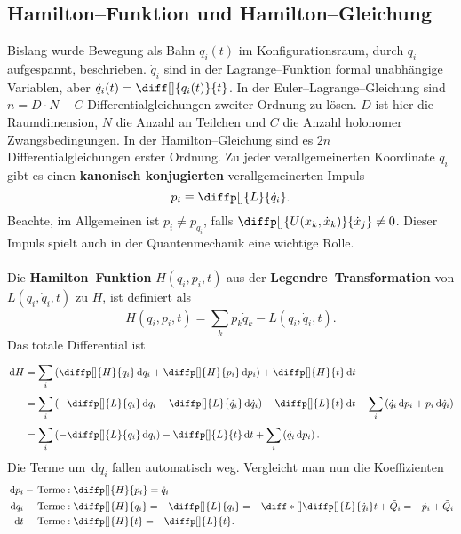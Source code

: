 \documentclass[a4paper,12pt]{article}
\newcommand{\td}{\,\text{d}}
\numberwithin{equation}{section}
\begin{document}
\subsection{Hamilton--Funktion und Hamilton--Gleichung}
Bislang wurde Bewegung als Bahn $q_i(t)$ im Konfigurationsraum, durch $q_i$ aufgespannt, beschrieben. $\dot{q}_i$ sind in der Lagrange--Funktion formal unabhängige Variablen, aber $\dot{q}_i(t)=\diff[]{q_i(t)}{t}$. In der Euler--Lagrange--Gleichung sind $n=D\cdot N-C$ Differentialgleichungen zweiter Ordnung zu lösen. $D$ ist hier die Raumdimension, $N$ die Anzahl an Teilchen und $C$ die Anzahl holonomer Zwangsbedingungen. In der Hamilton--Gleichung sind es $2n$ Differentialgleichungen erster Ordnung. Zu jeder verallgemeinerten Koordinate $q_i$ gibt es einen \textbf{kanonisch konjugierten} verallgemeinerten Impuls
\[ 
        p_i\equiv \diffp[]{L}{\dot{q}_i}
.\] 
Beachte, im Allgemeinen ist $p_i \neq p_{q_i}$, falls $\diffp[]{U(x_k,\dot{x}_k)}{\dot{x}_j}\neq 0$. Dieser Impuls spielt auch in der Quantenmechanik eine wichtige Rolle.\\\\\indent
Die \textbf{Hamilton--Funktion} $H\left(q_i,p_i,t\right)$ aus der \textbf{Legendre--Transformation} von $L(q_i,\dot{q}_i,t)$ zu $H$, ist definiert als
\[ 
        H\left(q_i,p_i,t\right)=\sum_{k}^{}p_k\dot{q}_k-L\left(q_i,\dot{q}_i,t\right) 
.\] 
Das totale Differential ist
\begin{align*}
        \td H&=\sum_{i}^{}\left(\diffp[]{H}{q_i}\td q_i+\diffp[]{H}{p_i}\td p_i\right)+\diffp[]{H}{t}\td t\\
             &=\sum_{i}^{}\left(-\diffp[]{L}{q_i}\td q_i-\diffp[]{L}{\dot{q}_i}\td \dot{q}_i\right)-\diffp[]{L}{t}\td t+\sum_{i}^{}\left(\dot{q}_i\td p_i+p_i\td \dot{q}_i\right)\\
             &=\sum_{i}^{}\left(-\diffp[]{L}{q_i}\td q_i\right)-\diffp[]{L}{t}\td t+\sum_{i}^{}\left(\dot{q}_i\td p_i\right)
.\end{align*}
Die Terme um $\td \dot{q}_i$ fallen automatisch weg. Vergleicht man nun die Koeffizienten
\begin{align*}
        \td p_i-\,\text{Terme}&:\diffp[]{H}{p_i}=\dot{q}_i\\
        \td q_i-\,\text{Terme}&:\diffp[]{H}{q_i}=-\diffp[]{L}{q_i}=-\diff*[]{\diffp[]{L}{\dot{q}_i}}{t}+\tilde Q_i=-\dot{p}_i+\tilde Q_i\\
        \td t-\,\text{Terme}&:\diffp[]{H}{t}=-\diffp[]{L}{t}
.\end{align*}
\end{document}
